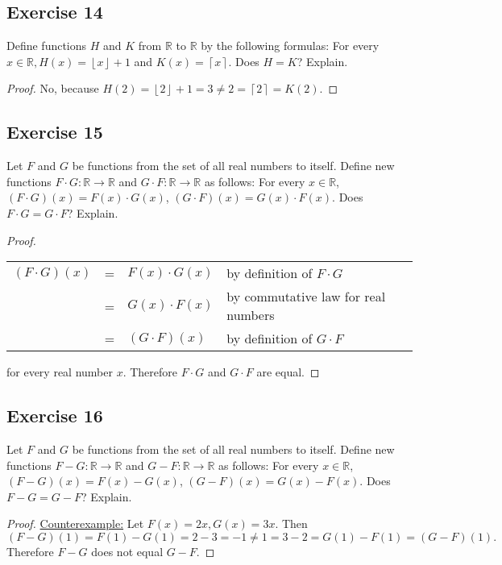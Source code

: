 \documentclass[14pt]{extarticle}
\newcommand{\R}{\mathbb{R}}
\newcommand{\cy}{\color{cyan}}
\newcommand{\floor}[1]{{\left\lfloor#1\right\rfloor}}
\newcommand{\ceil}[1]{{\left\lceil#1\right\rceil}}
\begin{document}
\subsection{Exercise 14}
Define functions $H$ and $K$ from $\R$ to $\R$ by the following formulas: For every \(x \in \R, H(x) = \floor{x}
+ 1\) and \(K(x) = \ceil{x}\). Does $H = K$? Explain.

\begin{proof}
    No, because \(H(2) = \floor{2} + 1 = 3 \neq 2 = \ceil{2} = K(2)\).
\end{proof}

\subsection{Exercise 15}
Let $F$ and $G$ be functions from the set of all real numbers to itself. Define new functions
\(F \cdot G: \R \to \R\) and \(G \cdot F: \R \to \R\) as follows: For every \(x \in \R\),
\((F \cdot G)(x) = F(x) \cdot G(x)\), \((G \cdot F)(x) = G(x) \cdot F(x)\). Does $F \cdot G = G \cdot F$? Explain.

\begin{proof}
    \begin{tabular}{rcll}
        \((F \cdot G)(x)\) & = & \(F(x) \cdot G(x)\) & {\cy by definition of $F \cdot G$}        \\
                           & = & \(G(x) \cdot F(x)\) & {\cy by commutative law for real numbers} \\
                           & = & \((G \cdot F)(x)\)  & {\cy by definition of $G \cdot F$}
    \end{tabular}

    for every real number $x$. Therefore $F\cdot G$ and $G \cdot F$ are equal.
\end{proof}

\subsection{Exercise 16}
Let $F$ and $G$ be functions from the set of all real numbers to itself. Define new functions
\(F - G: \R \to \R\) and \(G - F: \R \to \R\) as follows: For every \(x \in \R\), \((F - G)(x) = F(x) - G(x)\),
\((G - F)(x) = G(x) - F(x)\). Does $F - G = G - F$? Explain.

\begin{proof}
    \underline{Counterexample:} Let \(F(x) = 2x, G(x) = 3x\).
    Then
    \[
        (F-G)(1) = F(1) - G(1) = 2 - 3 = -1 \neq 1 = 3 - 2 = G(1) - F(1) = (G-F)(1).
    \]
    Therefore $F - G$ does not equal $G - F$.
\end{proof}
\end{document}
